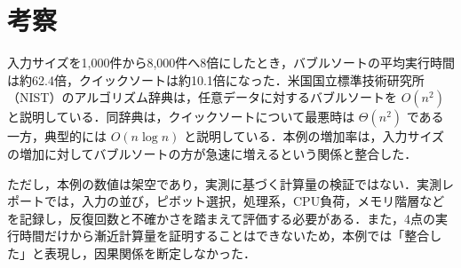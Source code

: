 \section{考察}

入力サイズを1,000件から8,000件へ8倍にしたとき，バブルソートの平均実行時間は約62.4倍，クイックソートは約10.1倍になった．米国国立標準技術研究所（NIST）のアルゴリズム辞典は，任意データに対するバブルソートを $O(n^2)$ と説明している．同辞典は，クイックソートについて最悪時は $\Theta(n^2)$ である一方，典型的には $O(n\log n)$ と説明している．本例の増加率は，入力サイズの増加に対してバブルソートの方が急速に増えるという関係と整合した．

ただし，本例の数値は架空であり，実測に基づく計算量の検証ではない．実測レポートでは，入力の並び，ピボット選択，処理系，CPU負荷，メモリ階層などを記録し，反復回数と不確かさを踏まえて評価する必要がある．また，4点の実行時間だけから漸近計算量を証明することはできないため，本例では「整合した」と表現し，因果関係を断定しなかった．

